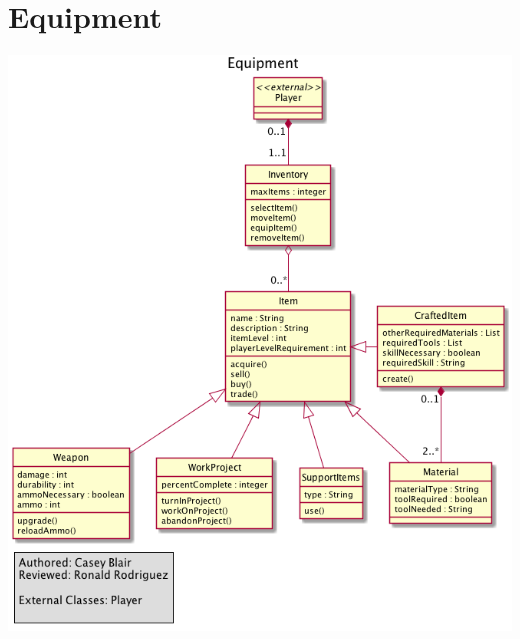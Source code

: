 \documentclass[12pt]{article}
\begin{document}
\section{Equipment}
\includegraphics[width=\textwidth]{equipment.png}
\end{document}
